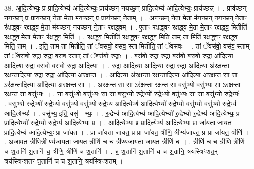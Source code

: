 \documentclass[17pt]{extarticle}
\begin{document}
38. आ॒दि॒त्येभ्यः॒ प्र प्रादि॒त्येभ्य॑ आदि॒त्येभ्यः॒ प्राय॑च्छन् नयच्छ॒न् प्रादि॒त्येभ्य॑ आदि॒त्येभ्यः॒ प्राय॑च्छन्न् । . प्राय॑च्छन् नयच्छ॒न् प्र प्राय॑च्छन् ने॒ता मे॒ता म॑यच्छ॒न् प्र प्राय॑च्छन् ने॒ताम् । . अ॒य॒च्छ॒न् ने॒ता मे॒ता म॑यच्छन् नयच्छन् ने॒ताꣳ र॑क्षद्ध्वꣳ रक्षद्ध्व मे॒ता म॑यच्छन् नयच्छन् ने॒ताꣳ र॑क्षद्ध्वम् । . ए॒ताꣳ र॑क्षद्ध्वꣳ रक्षद्ध्व मे॒ता मे॒ताꣳ र॑क्षद्ध्व॒ मितीति॑ रक्षद्ध्व मे॒ता मे॒ताꣳ र॑क्षद्ध्व॒ मिति॑ । . र॒क्ष॒द्ध्व॒ मितीति॑ रक्षद्ध्वꣳ रक्षद्ध्व॒ मिति॒ ताम् ता मिति॑ रक्षद्ध्वꣳ रक्षद्ध्व॒ मिति॒ ताम् । . इति॒ ताम् ता मितीति॒ तां ॅवस॑वो॒ वस॑व॒ स्ता मितीति॒ तां ॅवस॑वः । . तां ॅवस॑वो॒ वस॑व॒ स्ताम् तां ॅवस॑वो रु॒द्रा रु॒द्रा वस॑व॒ स्ताम् तां ॅवस॑वो रु॒द्राः । . वस॑वो रु॒द्रा रु॒द्रा वस॑वो॒ वस॑वो रु॒द्रा आ॑दि॒त्या आ॑दि॒त्या रु॒द्रा वस॑वो॒ वस॑वो रु॒द्रा आ॑दि॒त्याः । . रु॒द्रा आ॑दि॒त्या आ॑दि॒त्या रु॒द्रा रु॒द्रा आ॑दि॒त्या अ॑रक्षन्ता रक्षन्तादि॒त्या रु॒द्रा रु॒द्रा आ॑दि॒त्या अ॑रक्षन्त । . आ॒दि॒त्या अ॑रक्षन्ता रक्षन्तादि॒त्या आ॑दि॒त्या अ॑रक्षन्त॒ सा सा ऽर॑क्षन्तादि॒त्या आ॑दि॒त्या अ॑रक्षन्त॒ सा । . अ॒र॒क्ष॒न्त॒ सा सा ऽर॑क्षन्ता रक्षन्त॒ सा वसु॑भ्यो॒ वसु॑भ्यः॒ सा ऽर॑क्षन्ता रक्षन्त॒ सा वसु॑भ्यः । . सा वसु॑भ्यो॒ वसु॑भ्यः॒ सा सा वसु॑भ्यो रु॒द्रेभ्यो॑ रु॒द्रेभ्यो॒ वसु॑भ्यः॒ सा सा वसु॑भ्यो रु॒द्रेभ्यः॑ । . वसु॑भ्यो रु॒द्रेभ्यो॑ रु॒द्रेभ्यो॒ वसु॑भ्यो॒ वसु॑भ्यो रु॒द्रेभ्य॑ आदि॒त्येभ्य॑ आदि॒त्येभ्यो॑ रु॒द्रेभ्यो॒ वसु॑भ्यो॒ वसु॑भ्यो रु॒द्रेभ्य॑ आदि॒त्येभ्यः॑ । . वसु॑भ्य॒ इति॒ वसु॑ - भ्यः॒ । . रु॒द्रेभ्य॑ आदि॒त्येभ्य॑ आदि॒त्येभ्यो॑ रु॒द्रेभ्यो॑ रु॒द्रेभ्य॑ आदि॒त्येभ्यः॒ प्र प्रादि॒त्येभ्यो॑ रु॒द्रेभ्यो॑ रु॒द्रेभ्य॑ आदि॒त्येभ्यः॒ प्र । . आ॒दि॒त्येभ्यः॒ प्र प्रादि॒त्येभ्य॑ आदि॒त्येभ्यः॒ प्रा जा॑यता जायत॒ प्रादि॒त्येभ्य॑ आदि॒त्येभ्यः॒ प्रा जा॑यत । . प्रा जा॑यता जायत॒ प्र प्रा जा॑यत॒ त्रीणि॒ त्रीण्य॑जायत॒ प्र प्रा जा॑यत॒ त्रीणि॑ । . अ॒जा॒य॒त॒ त्रीणि॒त्री ण्य॑जायता जायत॒ त्रीणि॑ च च॒ त्रीण्य॑जायता जायत॒ त्रीणि॑ च । . त्रीणि॑ च च॒ त्रीणि॒ त्रीणि॑ च श॒तानि॑ श॒तानि॑ च॒ त्रीणि॒ त्रीणि॑ च श॒तानि॑ । . च॒ श॒तानि॑ श॒तानि॑ च च श॒तानि॒ त्रय॑स्त्रिꣳशत॒म् त्रय॑स्त्रिꣳशतꣳ श॒तानि॑ च च श॒तानि॒ त्रय॑स्त्रिꣳशतम् । \newline
\pagebreak
{}
\end{document}
